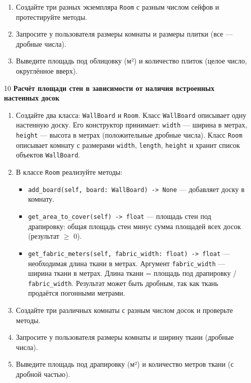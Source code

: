 \begin{enumerate}
\begin{enumerate}
    \item Создайте три разных экземпляра \texttt{Room} с разным числом сейфов и протестируйте методы.

    \item Запросите у пользователя размеры комнаты и размеры плитки (все — дробные числа).

    \item Выведите площадь под облицовку (м²) и количество плиток (целое число, округлённое вверх).
\end{enumerate}

\item[10] \textbf{Расчёт площади стен в зависимости от наличия встроенных настенных досок}
\begin{enumerate}
    \item Создайте два класса: \texttt{WallBoard} и \texttt{Room}.  
    Класс \texttt{WallBoard} описывает одну настенную доску. Его конструктор принимает:  
    \texttt{width} — ширина в метрах,  
    \texttt{height} — высота в метрах (положительные дробные числа).  
    Класс \texttt{Room} описывает комнату с размерами \texttt{width}, \texttt{length}, \texttt{height} и хранит список объектов \texttt{WallBoard}.

    \item В классе \texttt{Room} реализуйте методы:  
    \begin{itemize}
        \item \texttt{add\_board(self, board: WallBoard) -> None} — добавляет доску в комнату.
        \item \texttt{get\_area\_to\_cover(self) -> float} — площадь стен под драпировку: общая площадь стен минус сумма площадей всех досок (результат $\geqslant$ 0).
        \item \texttt{get\_fabric\_meters(self, fabric\_width: float) -> float} — необходимая длина ткани в метрах. Аргумент \texttt{fabric\_width} — ширина ткани в метрах. Длина ткани = площадь под драпировку / \texttt{fabric\_width}. Результат может быть дробным, так как ткань продаётся погонными метрами.
    \end{itemize}

    \item Создайте три различных комнаты с разным числом досок и проверьте методы.

    \item Запросите у пользователя размеры комнаты и ширину ткани (дробные числа).

    \item Выведите площадь под драпировку (м²) и количество метров ткани (с дробной частью).
\end{enumerate}


\end{enumerate}
